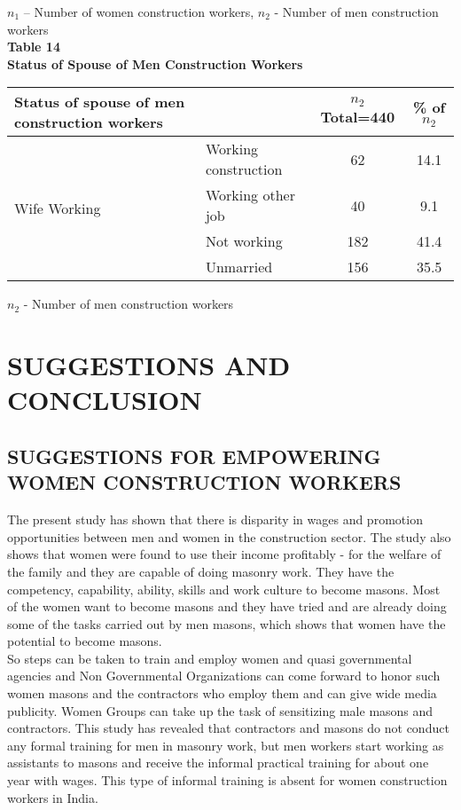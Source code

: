 \documentclass[12pt]{report}
\newcommand{\bt}[1]{\textbf{#1}}
\newcommand{\NI}{\noindent}
\begin{document}
	$n_1$ – Number of women construction workers, $n_2$ - Number of men construction workers\\
	\newpage
	\NI\bt{Table 14}\\
	\bt{Status of Spouse of Men Construction Workers}
	\begin{longtable}{p{}@{\hskip 0.1in}p{}@{\hskip 0.1in}c@{\hskip 0.1in}c@{\hskip 0.1in}}
		\hline
		\bt{Status of spouse of men construction workers} &  & $n_2${\footnotesize Total=440}  & {\footnotesize\% of }$n_2$\\ \hline
		\multirow{4}{=}{Wife Working} & Working construction & 62 & 14.1 \\
		& Working other job & 40 & 9.1 \\
		& Not working & 182 & 41.4 \\
		& Unmarried & 156 & 35.5 \\ \hline
	\end{longtable}
	$n_2$ - Number of men construction workers\\

	
	\chapter{SUGGESTIONS AND CONCLUSION}
	
	\section{SUGGESTIONS  FOR  EMPOWERING  WOMEN  CONSTRUCTION  WORKERS}
	The  present  study  has  shown  that  there  is  disparity  in  wages  and  promotion opportunities  between  men  and  women  in  the  construction  sector.  The  study  also  shows that  women  were  found  to  use  their  income  profitably  -  for  the  welfare  of  the  family  and they  are  capable  of  doing  masonry  work.  They  have  the  competency,  capability,  ability, skills  and  work  culture  to  become  masons.  Most  of  the  women  want  to  become  masons and  they  have  tried  and  are  already  doing  some  of  the  tasks  carried  out  by  men  masons, which  shows  that  women  have  the  potential  to  become  masons. \\
	
	So  steps  can  be  taken  to train  and  employ  women  and  quasi governmental  agencies  and  Non  Governmental Organizations  can  come  forward  to  honor  such  women  masons  and  the  contractors  who employ  them  and  can  give  wide  media  publicity.  Women  Groups  can  take  up  the  task  of sensitizing  male  masons  and  contractors. This  study  has  revealed  that  contractors  and  masons  do  not  conduct  any  formal training  for  men  in  masonry  work,  but  men  workers  start  working  as  assistants  to  masons and  receive  the  informal  practical  training  for  about  one  year  with  wages.  This  type  of informal  training  is  absent  for  women  construction  workers  in  India. \\
	
\end{document}
